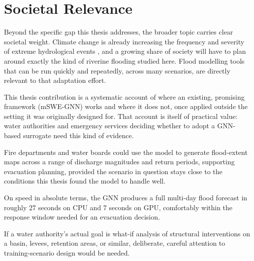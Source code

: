 \documentclass[12pt,a4paper]{report}
\begin{document}
{\section{Societal Relevance}
\label{sec:societal_relevance}

Beyond the specific gap this thesis addresses, the broader topic carries clear
societal weight. Climate change is already increasing the frequency and severity of
extreme hydrological events \citep{ipcc2021ar6}, and a growing share of society will
have to plan around exactly the kind of riverine flooding studied here. Flood
modelling tools that can be run quickly and repeatedly, across many scenarios, are
directly relevant to that adaptation effort.
 
This thesis contribution is a systematic account of where an
existing, promising framework (mSWE-GNN) works and where it does not, once applied
outside the setting it was originally designed for. That account is itself of
practical value: water authorities and emergency services deciding whether to adopt a
GNN-based surrogate need this kind of evidence.

Fire departments and water boards could use the model to generate flood-extent maps across a range of discharge magnitudes and
return periods, supporting evacuation planning, provided the scenario in question
stays close to the conditions this thesis found the model to handle well. 

On speed in absolute terms, the GNN produces a full multi-day flood forecast in
roughly 27 seconds on CPU and 7 seconds on GPU, comfortably within the response window
needed for an evacuation decision.
 
If a water authority's actual goal is what-if analysis
of structural interventions on a basin, levees, retention areas, or similar, deliberate, careful attention to training-scenario design would be needed. 


%
 
}
\end{document}
